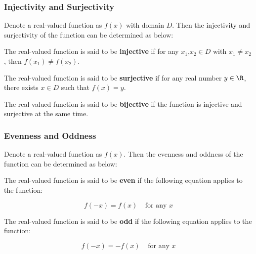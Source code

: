 \subsubsection{Injectivity and Surjectivity}
\begin{dft}
  Denote a real-valued function as $f(x)$ with domain $D$. Then the injectivity and surjectivity of the function can be determined as below:
  \begin{alist}
    \item The real-valued function is said to be \textbf{injective} if for any $x_{1}\text{,}x_{2}\in D$ with $x_{1}\neq x_{2}$, then $f(x_{1})\neq f(x_{2})$.
    \item The real-valued function is said to be \textbf{surjective} if for any real number $y\in \R$, there exists $x\in D$ such that $f(x)=y$.
    \item The real-valued function is said to be \textbf{bijective} if the function is injective and surjective at the same time.
  \end{alist}
\end{dft}

\subsubsection{Evenness and Oddness}
\begin{dft}
  Denote a real-valued function as $f(x)$. Then the evenness and oddness of the function can be determined as below:
  \begin{alist}
    \item The real-valued function is said to be \textbf{even} if the following equation applies to the function:

    $$f(-x)=f(x)\;\;\;\;\text{for any }x$$
    \item The real-valued function is said to be \textbf{odd} if the following equation applies to the function:

    $$f(-x)=-f(x)\;\;\;\;\text{for any }x$$
  \end{alist}
\end{dft}

